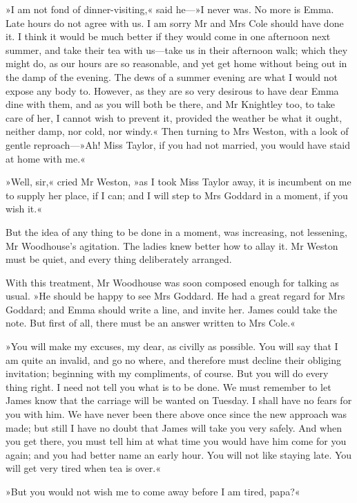 »I am not fond of dinner-visiting,« said he—»I never was. No more is Emma. Late hours do not agree with us. I am sorry Mr and Mrs Cole should have done it. I think it would be much better if they would come in one afternoon next summer, and take their tea with us—take us in their afternoon walk; which they might do, as our hours are so reasonable, and yet get home without being out in the damp of the evening. The dews of a summer evening are what I would not expose any body to. However, as they are so very desirous to have dear Emma dine with them, and as you will both be there, and Mr Knightley too, to take care of her, I cannot wish to prevent it, provided the weather be what it ought, neither damp, nor cold, nor windy.« Then turning to Mrs Weston, with a look of gentle reproach—»Ah! Miss Taylor, if you had not married, you would have staid at home with me.«

»Well, sir,« cried Mr Weston, »as I took Miss Taylor away, it is incumbent on me to supply her place, if I can; and I will step to Mrs Goddard in a moment, if you wish it.«

But the idea of any thing to be done in a moment, was increasing, not lessening, Mr Woodhouse's agitation. The ladies knew better how to allay it. Mr Weston must be quiet, and every thing deliberately arranged.

With this treatment, Mr Woodhouse was soon composed enough for talking as usual. »He should be happy to see Mrs Goddard. He had a great regard for Mrs Goddard; and Emma should write a line, and invite her. James could take the note. But first of all, there must be an answer written to Mrs Cole.«

»You will make my excuses, my dear, as civilly as possible. You will say that I am quite an invalid, and go no where, and therefore must decline their obliging invitation; beginning with my compliments, of course. But you will do every thing right. I need not tell you what is to be done. We must remember to let James know that the carriage will be wanted on Tuesday. I shall have no fears for you with him. We have never been there above once since the new approach was made; but still I have no doubt that James will take you very safely. And when you get there, you must tell him at what time you would have him come for you again; and you had better name an early hour. You will not like staying late. You will get very tired when tea is over.«

»But you would not wish me to come away before I am tired, papa?«


